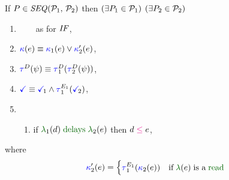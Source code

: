 \begin{scope}
  \noindent
  If $\aPS \in \sSEMI{\aPSS_1}{\aPSS_2}$ then $(\exists P_1\in\mathcal{P}_1)$ $(\exists P_2\in\mathcal{P}_2)$
  \begin{multicols}{2}
    \begin{enumerate}[topsep=0pt,label=(\textsc{s}\arabic*),ref=\textsc{s}\arabic*]
    \item \label{seq-E} %
      \,
      \,
      \,
      \, as for $\sIFTHEN{}{}{}$, %
      \setcounter{enumi}{\value{Bkappa}}
    \item \label{seq-kappa}
      ${\color{blue}\kappa}(e) \mathrel{\equiv} {{\color{blue}\kappa}_1(e)\lor{\color{blue}\kappa}'_2(e)}$,
    \item \label{seq-tau}
      $\aTr{\bEvs}{\bForm} \riff \aTr[1]{\bEvs}{\aTr[2]{\bEvs}{\bForm}}$,
    \item \label{seq-term}
      $\aTerm \riff \aTerm[1]\land\aTrAbbrv[1]{\aEvs_1}{\aTerm[2]}$,
    \item[] \setcounter{enumi}{\value{le}}
      \begin{enumerate}[leftmargin=0pt]
      \item \label{seq-le-delays}
        if $\labeling_1(\bEv) \rdelays \labeling_2(\aEv)$ then $\bEv\le\aEv$,
      \end{enumerate}
    \end{enumerate}
  \end{multicols}
  where
  \begin{displaymath}
    \labelingForm'_2(\aEv)=
    \begin{cases}
      \aTrAbbrv[1]{\aEvs_1}{\labelingForm_2(\aEv)} & \text{if}\; \labeling(\aEv) \;\text{is a}\sread

\end{cases}
\end{displaymath}
\end{scope}
